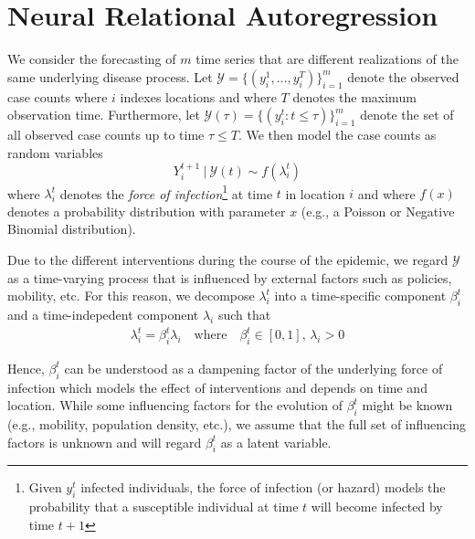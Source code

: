 \documentclass{article}
\newcommand{\Set}[1]{\mathcal{#1}}
\newcommand{\foi}{\lambda}
\begin{document}
\section{Neural Relational Autoregression}
\label{sec:org6298d16}
We consider the forecasting of \(m\) time series that are different realizations
of the same underlying disease process. Let \({\Set{Y} = \{(y_i^1, \ldots,
y_i^T)\}_{i=1}^m}\) denote the observed case counts where \(i\) indexes locations
and where \(T\) denotes the maximum observation time. Furthermore, let
\(\Set{Y}(\tau) = \{(y_i^t : t \leq \tau)\}_{i=1}^m\) denote the set of all
observed case counts up to time \(\tau \leq T\). We then model the case counts as
random variables
\begin{equation*}
    Y^{t+1}_i\ |\ \Set{Y}(t) \sim f(\foi_i^t)
\end{equation*}
where \(\foi_i^{t}\) denotes the \emph{force of infection}\footnote{Given \(y^t_i\) infected
individuals, the force of infection (or hazard) models the probability that a
susceptible individual at time \(t\) will become infected by time \(t+1\)} at time
\(t\) in location \(i\) and where \(f(x)\) denotes a probability distribution with
parameter \(x\) (e.g., a Poisson or Negative Binomial distribution).

Due to the different interventions during the course of the epidemic, we regard
\(\Set{Y}\) as a time-varying process that is influenced by external factors such
as policies, mobility, etc. For this reason, we decompose \(\foi_i^t\) into a
time-specific component \(\beta_i^t\) and a time-indepedent component
\(\foi_i\) such that
\begin{align*}
\foi_i^t = \beta_i^t \foi_i \quad\text{where}\quad \beta_i^t \in [0, 1],\, \foi_i > 0
\end{align*}

Hence, \(\beta_i^t\) can be understood as a dampening factor of the underlying
force of infection which models the effect of interventions and depends on time
and location. While some influencing factors for the evolution of \(\beta_i^t\)
might be known (e.g., mobility, population density, etc.), we assume that the
full set of influencing factors is unknown and will regard \(\beta_i^t\)
as a latent variable.
\end{document}
